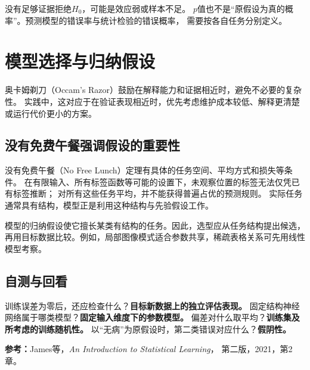 \begin{pitfall}[未拒绝不等于证明为真]
没有足够证据拒绝$H_0$，可能是效应弱或样本不足。
$p$值也不是“原假设为真的概率”。预测模型的错误率与统计检验的错误概率，
需要按各自任务分别定义。
\end{pitfall}

\section{模型选择与归纳假设}
\label{sec:learn-occam-nfl}
奥卡姆剃刀（Occam's Razor）鼓励在解释能力和证据相近时，避免不必要的复杂性。
实践中，这对应于在验证表现相近时，优先考虑维护成本较低、解释更清楚或运行代价更小的方案。

\subsection{没有免费午餐强调假设的重要性}
没有免费午餐（No Free Lunch）定理有具体的任务空间、平均方式和损失等条件。
在有限输入、所有标签函数等可能的设置下，未观察位置的标签无法仅凭已有标签推断；
对所有这些任务平均，并不能获得普遍占优的预测规则。
实际任务通常具有结构，模型正是利用这种结构与先验假设工作。

模型的归纳假设使它擅长某类有结构的任务。因此，选型应从任务结构提出候选，
再用目标数据比较。例如，局部图像模式适合参数共享，稀疏表格关系可先用线性模型考察。

\subsection{自测与回看}
训练误差为零后，还应检查什么？\textbf{目标新数据上的独立评估表现。}
固定结构神经网络属于哪类模型？\textbf{固定输入维度下的参数模型。}
偏差对什么取平均？\textbf{训练集及所考虑的训练随机性。}
以“无病”为原假设时，第二类错误对应什么？\textbf{假阴性。}

\smallskip
\begingroup\small
\noindent\textbf{参考：}James等，\textit{An Introduction to Statistical Learning}，
第二版，2021，第2章。
\par\endgroup
